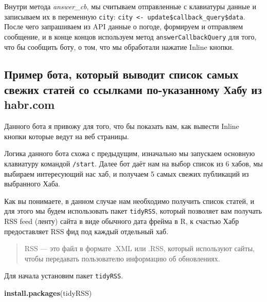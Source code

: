 \documentclass[
]{book}
\newenvironment{Shaded}{\begin{snugshade}}{\end{snugshade}}
\newcommand{\FunctionTok}[1]{\textcolor[rgb]{0.13,0.29,0.53}{\textbf{#1}}}
\newcommand{\NormalTok}[1]{#1}
\newcommand{\StringTok}[1]{\textcolor[rgb]{0.31,0.60,0.02}{#1}}
\begin{document}
Внутри метода \emph{answer\_cb}, мы считываем отправленные с клавиатуры данные и записываем их в переменную \texttt{city}: \texttt{city\ \textless{}-\ update\$callback\_query\$data}. После чего запрашиваем из API данные о погоде, формируем и отправляем сообщение, и в конце концов используем метод \texttt{answerCallbackQuery} для того, что бы сообщить боту, о том, что мы обработали нажатие Inline кнопки.

\subsection{Пример бота, который выводит список самых свежих статей со ссылками по-указанному Хабу из habr.com}\label{ux43fux440ux438ux43cux435ux440-ux431ux43eux442ux430-ux43aux43eux442ux43eux440ux44bux439-ux432ux44bux432ux43eux434ux438ux442-ux441ux43fux438ux441ux43eux43a-ux441ux430ux43cux44bux445-ux441ux432ux435ux436ux438ux445-ux441ux442ux430ux442ux435ux439-ux441ux43e-ux441ux441ux44bux43bux43aux430ux43cux438-ux43fux43e-ux443ux43aux430ux437ux430ux43dux43dux43eux43cux443-ux445ux430ux431ux443-ux438ux437-habr.com}

Данного бота я привожу для того, что бы показать вам, как вывести Inline кнопки которые ведут на веб страницы.

Логика данного бота схожа с предыдущим, изначально мы запускаем основную клавиатуру командой \texttt{/start}. Далее бот даёт нам на выбор список из 6 хабов, мы выбираем интересующий нас хаб, и получаем 5 самых свежих публикаций из выбранного Хаба.

Как вы понимаете, в данном случае нам необходимо получить список статей, и для этого мы будем использовать пакет \texttt{tidyRSS}, который позволяет вам получать RSS feed (ленту) сайта в виде обычного дата фрейма в R, к счастью Хабр предоставляет RSS фид под каждый отдельный хаб.

\begin{quote}
RSS --- это файл в формате .XML или .RSS, который используют сайты, чтобы передавать пользователю информацию об обновлениях.
\end{quote}

Для начала установим пакет \texttt{tidyRSS}.

\begin{Shaded}
\begin{Highlighting}[]
\FunctionTok{install.packages}\NormalTok{(}\StringTok{\textquotesingle{}\textasciigrave{}tidyRSS\textasciigrave{}\textquotesingle{}}\NormalTok{)}
\end{Highlighting}
\end{Shaded}
\end{document}
